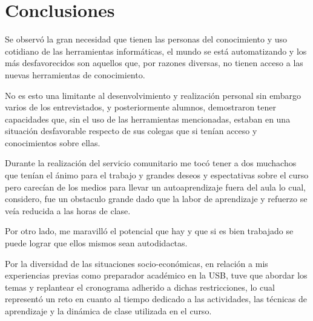 \chapter*{Conclusiones}
    Se observó la gran necesidad que tienen las personas del conocimiento y uso cotidiano de las herramientas informáticas, el mundo se está automatizando y los más desfavorecidos son aquellos que, por razones diversas, no tienen acceso a las nuevas herramientas de conocimiento.
    
    No es esto una limitante al desenvolvimiento y realización personal sin embargo varios de los entrevistados, y posteriormente alumnos, demostraron tener capacidades que, sin el uso de las herramientas mencionadas, estaban en una situación desfavorable respecto de sus colegas que si tenían acceso y conocimientos sobre ellas.

    Durante la realización del servicio comunitario me tocó tener a dos muchachos que tenían el ánimo para el trabajo y grandes deseos y espectativas sobre el curso pero carecían de los medios para llevar un autoaprendizaje fuera del aula lo cual, considero, fue un obstaculo grande dado que la labor de aprendizaje y refuerzo se veía reducida a las horas de clase.
    
    Por otro lado, me maravilló el potencial que hay y que si es bien trabajado se puede lograr que ellos mismos sean autodidactas.
    
    Por la diversidad de las situaciones socio-económicas, en relación a mis experiencias previas como preparador académico en la USB, tuve que abordar los temas y replantear el cronograma adherido a dichas restricciones, lo cual representó un reto en cuanto al tiempo dedicado a las actividades, las técnicas de aprendizaje y la dinámica de clase utilizada en el curso.
    
	\pagebreak